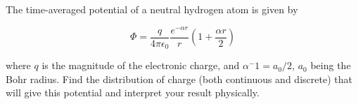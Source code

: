 \begin{question}

The time-averaged potential of a neutral hydrogen atom is given by

\begin{equation}
  \Phi = \frac{q}{4\pi\epsilon_0} \frac{e^{-\alpha r}}{r} \left( 1 +
  \frac{\alpha r}{2} \right)
\end{equation}

where $q$ is the magnitude of the electronic charge, and $\alpha^-1 =
a_0/2$, $a_0$ being the Bohr radius. Find the distribution of charge
(both continuous and discrete) that will give this potential and
interpret your result physically.

\end{question}
